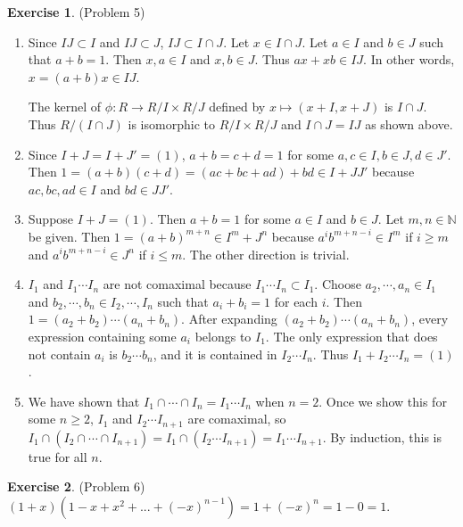 \documentclass[12pt, psamsfonts]{amsart}
\theoremstyle{definition}
\newtheorem*{exer}{Exercise}
\theoremstyle{remark}
\numberwithin{equation}{section}
\begin{document}
\begin{exer}{(Problem 5)}
  \begin{enumerate}
    \item 
      Since $IJ \subset I$ and $IJ \subset J$, $IJ \subset I \cap J$.
      Let $x \in I \cap J$.
      Let $a \in I$ and $b \in J$ such that $a + b = 1$.
      Then $x, a \in I$ and $x, b \in J$.
      Thus $ax + xb \in IJ$.
      In other words, $x = (a + b)x \in IJ$.

      The kernel of $\phi: R \rightarrow R / I \times R / J$ defined by $x \mapsto (x + I, x + J)$ is $I \cap J$.
      Thus $R / (I \cap J)$ is isomorphic to $R / I \times R / J$ and $I \cap J = IJ$ as shown above.
    \item
      Since $I + J = I + J' = (1)$, $a + b = c + d = 1$ for some $a, c \in I, b \in J, d \in J'$.
      Then $1 = (a + b)(c + d) = (ac + bc + ad) + bd \in I + JJ'$ because $ac, bc, ad \in I$ and $bd \in JJ'$.
    \item
      Suppose $I + J = (1)$.
      Then $a + b = 1$ for some $a \in I$ and $b \in J$.
      Let $m, n \in \mathbb{N}$ be given.
      Then $1 = (a + b)^{m + n} \in I^m + J^n$ because $a^ib^{m + n - i} \in I^m$ if $i \geq m$ and $a^ib^{m + n - i} \in J^n$ if $i \leq m$.
      The other direction is trivial.
    \item
      $I_1$ and $I_1 \cdots I_n$ are not comaximal because $I_1 \cdots I_n \subset I_1$.
      Choose $a_2, \cdots, a_n \in I_1$ and $b_2, \cdots, b_n \in I_2, \cdots, I_n$ such that $a_i + b_i = 1$ for each $i$.
      Then $1 = (a_2 + b_2) \cdots (a_n + b_n)$.
      After expanding $(a_2 + b_2) \cdots (a_n + b_n)$, every expression containing some $a_i$ belongs to $I_1$.
      The only expression that does not contain $a_i$ is $b_2 \cdots b_n$, and it is contained in $I_2 \cdots I_n$.
      Thus $I_1 + I_2 \cdots I_n = (1)$.
    \item
      We have shown that $I_1 \cap \cdots \cap I_n = I_1 \cdots I_n$ when $n = 2$.
      Once we show this for some $n \geq 2$, $I_1$ and $I_2 \cdots I_{n + 1}$ are comaximal, so $I_1 \cap (I_2 \cap \cdots \cap I_{n + 1}) = I_1 \cap (I_2 \cdots I_{n + 1}) = I_1 \cdots I_{n + 1}$.
      By induction, this is true for all $n$.
  \end{enumerate}
\end{exer}

\begin{exer}{(Problem 6)}
  $(1 + x)(1 - x + x^2 + ... + (-x)^{n - 1}) = 1 + (-x)^n = 1 - 0 = 1$.
\end{exer}
\end{document}

